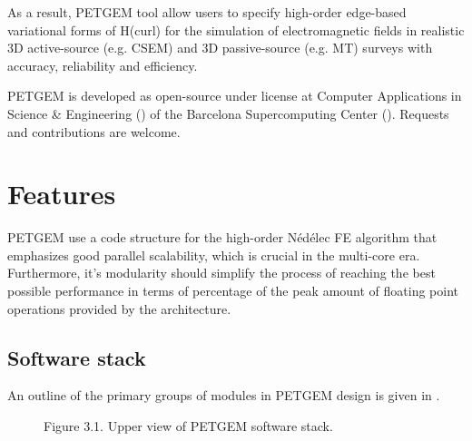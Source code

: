 \documentclass[letterpaper,10pt,english]{sphinxmanual}
\begin{document}
As a result, PETGEM tool allow users to specify high-order edge-based
variational forms of H(curl) for the simulation of electromagnetic fields
in realistic 3D active-source (e.g. CSEM) and 3D passive-source (e.g. MT) surveys
with accuracy, reliability and efficiency.

PETGEM is developed as open-source under
 license at Computer
Applications in Science \& Engineering
()
of the Barcelona Supercomputing Center ().
Requests and contributions are welcome.


\chapter{Features}
\label{\detokenize{Features:features}}\label{\detokenize{Features:id1}}\label{\detokenize{Features::doc}}
PETGEM use a code structure for the high-order Nédélec FE algorithm that emphasizes
good parallel scalability, which is crucial in the multi-core era.
Furthermore, it’s modularity should simplify the process of reaching the
best possible performance in terms of percentage of the peak amount of
floating point operations provided by the architecture.


\section{Software stack}
\label{\detokenize{Features:software-stack}}\label{\detokenize{Features:id2}}
An outline of the primary groups of modules in PETGEM design is
given in {\hyperref[\detokenize{Features:figure-3-1}]{}}.

\begin{figure}[htbp]
\centering
\capstart

\noindent{}
\caption{Figure 3.1. Upper view of PETGEM software stack.}\label{\detokenize{Features:id13}}\label{\detokenize{Features:figure-3-1}}\end{figure}
\end{document}
